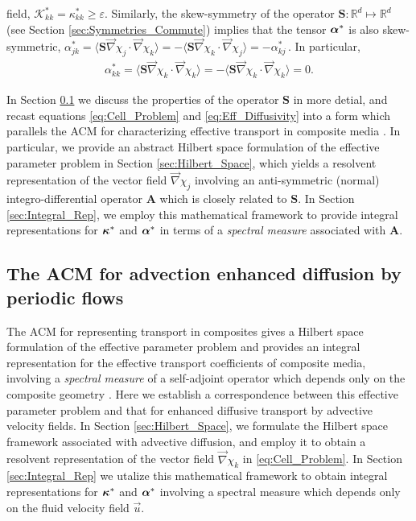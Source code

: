 \documentclass[11pt]{amsart}
\newcommand{\Sb}{\mathbf{S}}
\newcommand{\Ab}{\mathbf{A}}
\newcommand{\Kc}{\mathcal{K}}
\newcommand\balpha{\mbox{\boldmath${\alpha}$}}
\newcommand\bkappa{\mbox{\boldmath${\kappa}$}}
\begin{document}
field, $\Kc^*_{kk}=\kappa^*_{kk}\geq\varepsilon$. Similarly, the skew-symmetry of the
operator $\Sb:\mathbb{R}^d\mapsto\mathbb{R}^d$ (see Section
\ref{sec:Symmetries_Commute}) implies that the tensor $\balpha^*$ is also
skew-symmetric,
$\alpha^*_{jk}=\langle\Sb\vec{\nabla}\chi_j\cdot\vec{\nabla}\chi_k\rangle=-\langle\Sb\vec{\nabla}\chi_k\cdot\vec{\nabla}\chi_j\rangle=-\alpha^*_{kj}\,$. In
particular,    
%
\begin{align}\label{eq:Sb_Skew}
  \alpha^*_{kk}=\langle\Sb\vec{\nabla}\chi_k\cdot\vec{\nabla}\chi_k\rangle=-\langle\Sb\vec{\nabla}\chi_k\cdot\vec{\nabla}\chi_k\rangle=0.  
\end{align}
%
  




In Section \ref{sec:ACM} we discuss the properties of the operator
$\Sb$ in more detial, and recast equations \eqref{eq:Cell_Problem}
and \eqref{eq:Eff_Diffusivity} into a form which parallels the ACM for
characterizing effective transport in composite media
\cite{Golden:CMP-473}. In particular, we provide an abstract Hilbert
space formulation of the effective parameter problem in Section
\ref{sec:Hilbert_Space}, which yields a resolvent representation of the
vector field $\vec{\nabla}\chi_j$ involving an anti-symmetric (normal)
integro-differential operator $\Ab$ which is closely related to
$\Sb$. In Section  \ref{sec:Integral_Rep}, we employ this mathematical
framework to provide integral representations for $\bkappa^*$ and
$\balpha^*$ in terms of a \emph{spectral measure} associated with
$\Ab$.    







\subsection{The ACM for advection enhanced diffusion by periodic
  flows} \label{sec:ACM}   
%
The ACM for representing transport in composites gives a Hilbert space
formulation of the effective parameter problem and provides an
integral representation for the effective transport coefficients of
composite media, involving a \emph{spectral measure} of a self-adjoint
operator which depends only on the composite geometry
\cite{Golden:CMP-473,Murphy:JMP:063506,MILTON:2002:TC}. Here 
we establish a correspondence between this effective parameter problem
and that for enhanced diffusive transport by advective velocity
fields. In Section \ref{sec:Hilbert_Space}, we formulate the Hilbert
space framework associated with advective diffusion, and employ it to
obtain a resolvent representation of the vector field $\vec{\nabla}\chi_k$ in
\eqref{eq:Cell_Problem}. In Section \ref{sec:Integral_Rep} we utalize
this mathematical framework to obtain integral representations for 
$\bkappa^*$ and $\balpha^*$ involving a spectral measure which depends
only on the fluid velocity field $\vec{u}$.    
\end{document}

